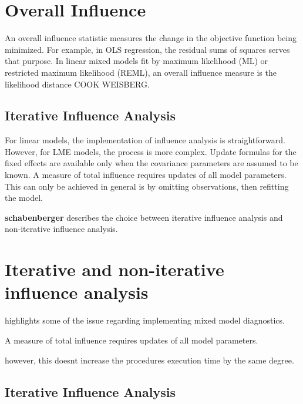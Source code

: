 \documentclass[12pt, a4paper]{article}
\begin{document}
	



\section{Overall Influence}
An overall influence statistic measures the change in the objective function being minimized. For example, in
OLS regression, the residual sums of squares serves that purpose. In linear mixed models fit by
 maximum likelihood (ML) or  restricted maximum likelihood (REML), an overall influence measure is the  likelihood distance COOK WEISBERG.



\subsection{Iterative Influence Analysis}

For linear models, the implementation of influence analysis is straightforward.
However, for LME models, the process is more complex. Update formulas for the fixed effects are available only when the covariance parameters are assumed to be known. A measure of total influence requires updates of all model parameters.
This can only be achieved in general is by omitting observations, then refitting the model.

\textbf{schabenberger} describes the choice between  iterative influence analysis and  non-iterative influence analysis.






\section{Iterative and non-iterative influence analysis} %
\citet{schabenberger} highlights some of the issue regarding implementing mixed model diagnostics.

A measure of total influence requires updates of all model parameters.

however, this doesnt increase the procedures execution time by the same degree.
\subsection{Iterative Influence Analysis}
\end{document}

